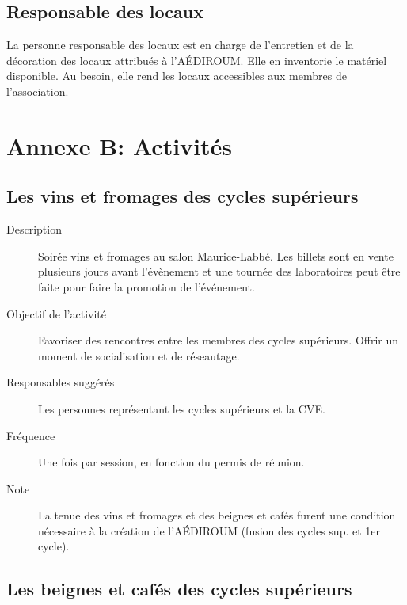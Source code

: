 \documentclass{aediroum}
\begin{document}
\subsection{Responsable des locaux}

La personne responsable des locaux est en charge de l’entretien et de la décoration des locaux attribués à l’AÉDIROUM. Elle en inventorie le matériel disponible. Au besoin, elle rend les locaux accessibles aux membres de l’association.

\section{Annexe B: Activités}\label{sec:activites}

\subsection{Les vins et fromages des cycles supérieurs}\label{sec:vins-et-fromages}

\begin{description}
    \item[Description] Soirée vins et fromages au salon Maurice-Labbé. Les billets sont en vente plusieurs jours avant l'évènement et une tournée des laboratoires peut être faite pour faire la promotion de l'événement.
    \item[Objectif de l'activité] Favoriser des rencontres entre les membres des cycles supérieurs. Offrir un moment de socialisation et de réseautage.
    \item[Responsables suggérés] Les personnes représentant les cycles supérieurs et la CVE.
    \item[Fréquence] Une fois par session, en fonction du permis de réunion.
    \item[Note] La tenue des vins et fromages et des beignes et cafés furent une condition nécessaire à la création de l'AÉDIROUM (fusion des cycles sup. et 1er cycle).
\end{description}

\subsection{Les beignes et cafés des cycles supérieurs}\label{sec:beignes-et-cafes}
\end{document}
